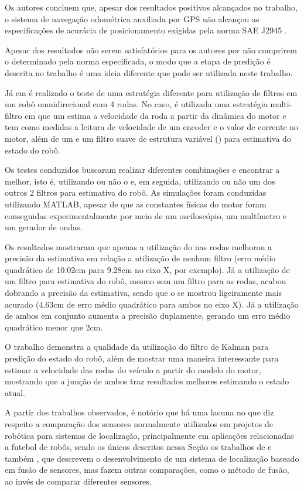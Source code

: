 \documentclass[acronym, symbols, table, deposito]{fei}
\begin{document}
Os autores concluem que, apesar dos resultados positivos alcançados no trabalho, o sistema de navegação odométrica auxiliada por GPS não alcançou as especificações de acurácia de posicionamento exigidas pela norma SAE J2945 \cite{sae2016board}.

Apesar dos resultados não serem satisfatórios para os autores por não cumprirem o determinado pela norma especificada, o modo que a etapa de predição é descrita no trabalho é uma ideia diferente que pode ser utilizada neste trabalho.

Já em \textcite{9233826} é realizado o teste de uma estratégia diferente para utilização de filtros em um robô omnidirecional com 4 rodas. No caso, é utilizada uma estratégia multi-filtro em que um  estima a velocidade da roda a partir da dinâmica do motor e tem como medidas a leitura de velocidade de um encoder e o valor de corrente no motor, além de um  e um filtro suave de estrutura variável () para estimativa do estado do robô.

Os testes conduzidos buscaram realizar diferentes combinações e encontrar a melhor, isto é, utilizando ou não o  e, em seguida, utilizando ou não um dos outros 2 filtros para estimativa do robô. As simulações foram conduzidas utilizando MATLAB, apesar de que as constantes físicas do motor foram conseguidas experimentalmente por meio de um osciloscópio, um multímetro e um gerador de ondas.

Os resultados mostraram que apenas a utilização do  nas rodas melhorou a precisão da estimativa em relação a utilização de nenhum filtro (erro médio quadrático de 10.02cm para 9.28cm no eixo X, por exemplo). Já a utilização de um filtro para estimativa do robô, mesmo sem um filtro para as rodas, acabou dobrando a precisão da estimativa, sendo que o  se mostrou ligeiramente mais acurado (4.63cm de erro médio quadrático para ambos no eixo X). Já a utilização de ambos em conjunto aumenta a precisão duplamente, gerando um erro médio quadrático menor que 2cm.

O trabalho demonstra a qualidade da utilização do filtro de Kalman para predição do estado do robô, além de mostrar uma maneira interessante para estimar a velocidade das rodas do veículo a partir do modelo do motor, mostrando que a junção de ambos traz resultados melhores estimando o estado atual.

A partir dos trabalhos observados, é notório que há uma lacuna no que diz respeito a comparação dos sensores normalmente utilizados em projetos de robótica para sistemas de localização, principalmente em aplicações relacionadas a futebol de robôs, sendo os únicos descritos nessa Seção os trabalhos de \textcite{aguiar2017kalman} e também \cite{ismail2022soccer}, que descrevem o desenvolvimento de um sistema de localização baseado em fusão de sensores, mas fazem outras comparações, como o método de fusão, ao invés de comparar diferentes sensores.
\end{document}
